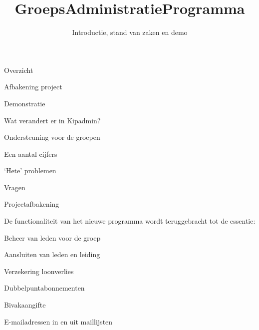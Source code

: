 \documentclass[chiro,pdf]{prosper}
\title{GroepsAdministratieProgramma}
\author{Introductie, stand van zaken en demo}
\begin{document}
\maketitle

%
%

{
\begin{slide}{Overzicht}

\begin{itemstep}
\item Afbakening project
\item Demonstratie
\item Wat verandert er in Kipadmin?
\item Ondersteuning voor de groepen
\item Een aantal cijfers
\item `Hete' problemen
\item Vragen
\end{itemstep}

\end{slide}
}

%
%

{
\begin{slide}{Projectafbakening}

De functionaliteit van het nieuwe programma wordt teruggebracht tot de essentie:
\begin{itemstep}
\item Beheer van leden voor de groep
\item Aansluiten van leden en leiding
\item Verzekering loonverlies
\item Dubbelpuntabonnementen
\item Bivakaangifte
\item E-mailadressen in en uit maillijsten
\end{itemstep}

\end{slide}
}

%
%
\end{document}
